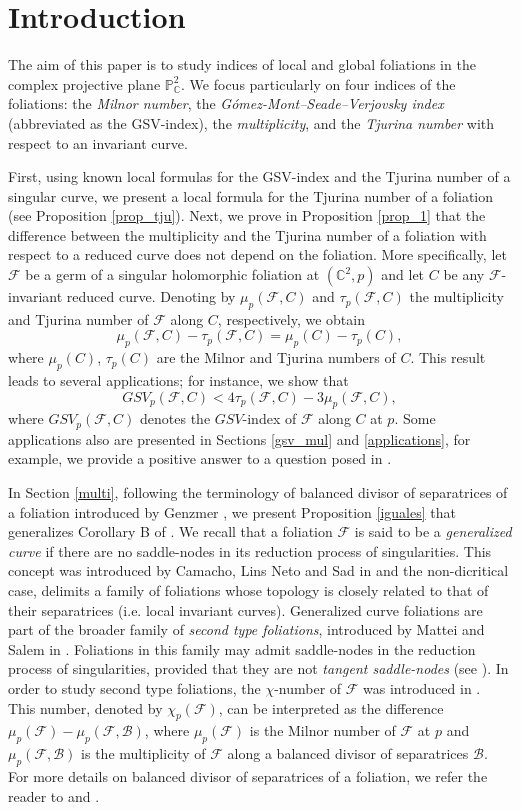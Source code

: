 \documentclass[11pt]{amsart}
\newcommand{\C}{\mathbb{C}}
\newcommand{\F}{\mathcal{F}}
\newcommand{\B}{\mathcal{B}}
\begin{document}
\section{Introduction}
The aim of this paper is to study indices of local and global foliations in the complex projective plane \(\mathbb{P}^2_{\mathbb{C}}\). We focus particularly on four indices of the foliations: the \textit{Milnor number}, the \textit{G\'omez-Mont--Seade--Verjovsky index} (abbreviated as the GSV-index), the \textit{multiplicity}, and the \textit{Tjurina number} with respect to an invariant curve. 
\par First, using known local formulas for the GSV-index and the Tjurina number of a singular curve, we present a local formula for the Tjurina number of a foliation (see Proposition \ref{prop_tju}). Next, we prove in Proposition \ref{prop_1} that the difference between the multiplicity and the Tjurina number of a foliation with respect to a reduced curve does not depend on the foliation. More specifically, let $\F$ be a germ of a singular holomorphic foliation at $(\C^2,p)$ and let $C$ be any $\F$-invariant reduced curve. Denoting by $\mu_p(\F,C)$ and $\tau_p(\F,C)$ the multiplicity and Tjurina number of $\F$ along $C$, respectively, we obtain
\[\mu_p(\F,C)-\tau_p(\F,C)=\mu_p(C)-\tau_p(C),\]
 \noindent where $\mu_p(C)$, $\tau_p(C)$ are the Milnor and Tjurina numbers of $C$. 
This result leads to several applications; for instance, we show that 
\[GSV_p(\F,C) < 4\tau_p(\F,C) - 3\mu_p(\F,C),\]
where $GSV_p(\F,C)$ denotes the $GSV$-index of $\F$ along $C$ at $p$.
Some applications also are presented in  Sections \ref{gsv_mul} and \ref{applications}, for example, we provide a positive answer to a question posed in \cite{FP-GB-SM2024}.
\par In Section \ref{multi}, following the terminology of balanced divisor of separatrices of a foliation introduced by Genzmer \cite{Genzmer}, we present Proposition \ref{iguales} that generalizes Corollary B of \cite{FP-GB-SM2021}. We recall that a foliation $\F$ is said to be a \textit{generalized curve} if there are no saddle-nodes in its reduction process of singularities. This concept was introduced by Camacho, Lins Neto and Sad in \cite{CLS} and the non-dicritical case, delimits a family of foliations whose topology is closely related to that of their separatrices (i.e. local invariant curves). Generalized curve foliations are part of the broader family of \textit{second type foliations}, introduced by Mattei and Salem in \cite{mattei}. Foliations in this family may admit saddle-nodes in the reduction process of singularities, provided that they are not \textit{tangent saddle-nodes} (see \cite[Definition 2.1]{FP-M}). In order to study second type foliations, the $\chi$-number of $\F$ was introduced in \cite[Section 3]{FP-GB-SM2021}. This number, denoted by $\chi_p(\F)$, can be interpreted as the difference $\mu_p(\F)-\mu_p(\F,\B)$, where $\mu_p(\F)$ is the Milnor number of $\F$ at $p$ and $\mu_p(\F,\B)$ is the multiplicity of $\F$ along a balanced divisor of separatrices $\B$. For more details on balanced divisor of separatrices of a foliation, we refer the reader to \cite{Genzmer} and \cite{Genzmer-Mol}.
\end{document}
